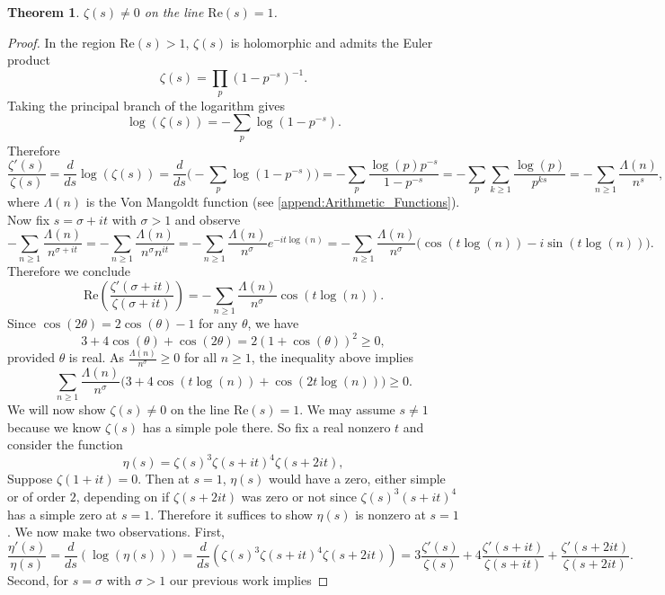 \documentclass[12pt]{book}
\newtheorem{theorem}{Theorem}[section]
\theoremstyle{definition}\newframedtheorem{method}{Method}
\newcommand{\z}{\zeta}
\renewcommand{\t}{\theta}
\newcommand{\s}{\sigma}
\renewcommand{\L}{\Lambda}
\newcommand{\<}{\langle}
\renewcommand{\>}{\rangle}
\renewcommand{\Re}{\mathrm{Re}}
\begin{document}
      \begin{theorem}\label{thm:nonvanishing_of_zeta_on_Re(s)=1}
        $\z(s) \neq 0$ on the line $\Re(s) = 1$.
      \end{theorem}
      \begin{proof}
        In the region $\Re(s) > 1$, $\z(s)$ is holomorphic and admits the Euler product
        \[
          \z(s) = \prod_{p}(1-p^{-s})^{-1}.
        \]
        Taking the principal branch of the logarithm gives
        \[
          \log(\z(s)) = -\sum_{p}\log(1-p^{-s}).
        \]
        Therefore
        \[
          \frac{\z'(s)}{\z(s)} = \frac{d}{ds}\log(\z(s)) = \frac{d}{ds}\bigg(-\sum_{p}\log(1-p^{-s})\bigg) = -\sum_{p}\frac{\log(p)p^{-s}}{1-p^{-s}} = -\sum_{p}\sum_{k \ge 1}\frac{\log(p)}{p^{ks}} = -\sum_{n \ge 1}\frac{\L(n)}{n^{s}},
        \]
        where $\L(n)$ is the Von Mangoldt function (see \cref{append:Arithmetic_Functions}). Now fix $s = \s+it$ with $\s > 1$ and observe
        \[
          -\sum_{n \ge 1}\frac{\L(n)}{n^{\s+it}} = -\sum_{n \ge 1}\frac{\L(n)}{n^{\s}n^{it}} = -\sum_{n \ge 1}\frac{\L(n)}{n^{\s}}e^{-it\log(n)} = -\sum_{n \ge 1}\frac{\L(n)}{n^{\s}}\bigg(\cos(t\log(n))-i\sin(t\log(n))\bigg).
        \]
        Therefore we conclude
        \[
          \Re\left(\frac{\z'(\s+it)}{\z(\s+it)}\right) = -\sum_{n \ge 1}\frac{\L(n)}{n^{\s}}\cos(t\log(n)).
        \]
        Since $\cos(2\t) = 2\cos(\t)-1$ for any $\t$, we have
        \[
          3+4\cos(\t)+\cos(2\t) = 2(1+\cos(\t))^{2} \ge 0,
        \]
        provided $\t$ is real. As $\frac{\L(n)}{n^{\s}} \ge 0$ for all $n \ge 1$, the inequality above implies
        \[
          \sum_{n \ge 1}\frac{\L(n)}{n^{\s}}\bigg(3+4\cos(t\log(n))+\cos(2t\log(n))\bigg) \ge 0.
        \]
        We will now show $\z(s) \neq 0$ on the line $\Re(s) = 1$. We may assume $s \neq 1$ because we know $\z(s)$ has a simple pole there. So fix a real nonzero $t$ and consider the function
        \[
          \eta(s) = \z(s)^{3}\z(s+it)^{4}\z(s+2it),
        \]
        Suppose $\z(1+it) = 0$. Then at $s = 1$, $\eta(s)$ would have a zero, either simple or of order $2$, depending on if $\z(s+2it)$ was zero or not since $\z(s)^{3}(s+it)^{4}$ has a simple zero at $s = 1$. Therefore it suffices to show $\eta(s)$ is nonzero at $s = 1$. We now make two observations. First,
        \[
          \frac{\eta'(s)}{\eta(s)} = \frac{d}{ds}(\log(\eta(s))) = \frac{d}{ds}(\z(s)^{3}\z(s+it)^{4}\z(s+2it)) = 3\frac{\z'(s)}{\z(s)}+4\frac{\z'(s+it)}{\z(s+it)}+\frac{\z'(s+2it)}{\z(s+2it)}.
        \]
        Second, for $s = \s$ with $\s > 1$ our previous work implies

\end{proof}
\end{document}

